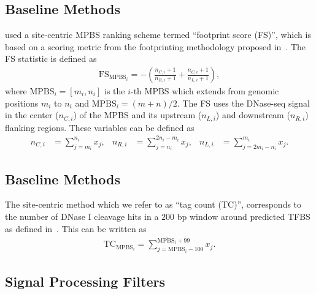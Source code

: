 \subsection{Baseline Methods}
\label{sec:baseline.methods}


\cite{he2014} used a site-centric MPBS ranking scheme termed ``footprint score (FS)'', which is based on a scoring metric from the footprinting methodology proposed in~\cite{neph2012a}. The FS statistic is defined as
\begin{align}
\text{FS}_{\text{MPBS}_{i}} = -\left(\frac{{n}_{C,i}+1}{{n}_{R,i}+1} + \frac{{n}_{C,i}+1}{{n}_{L,i}+1}\right),
\label{eq:fs1}
\end{align}
where $\text{MPBS}_{i} = [{m}_{i},{n}_{i}]$ is the $i$-th MPBS which extends from genomic positions ${m}_{i}$ to ${n}_{i}$ and $\overline{\text{MPBS}_{i}} = (m+n)/2$. The FS uses the DNase-seq signal in the center (${n}_{C,i}$) of the MPBS and its upstream (${n}_{L,i}$) and downstream (${n}_{R,i}$) flanking regions. These variables can be defined as
\begin{align}
{n}_{C,i} &= \sum_{j={m}_{i}}^{{n}_{i}} {x}_{j}, &
{n}_{R,i} &= \sum_{j={n}_{i}}^{2{n}_{i}-{m}_{i}} {x}_{j}, &
{n}_{L,i} &= \sum_{j=2{m}_{i}-{n}_{i}}^{{m}_{i}} {x}_{j}.
\label{eq:fs2}
\end{align}

\subsection{Baseline Methods}
\label{sec:baseline.methods}


The site-centric method which we refer to as ``tag count (TC)'', corresponds to the number of DNase I cleavage hits in a $200$ bp window around predicted TFBS as defined in~\cite{he2014}. This can be written as
\begin{align}
\text{TC}_{\text{MPBS}_{i}} = \sum_{j=\overline{\text{MPBS}_{i}}-100}^{\overline{\text{MPBS}_{i}}+99} {x}_{j}.
\label{eq:tc}
\end{align}

\subsection{Signal Processing Filters}
\label{sec:signal.processing.filters}

